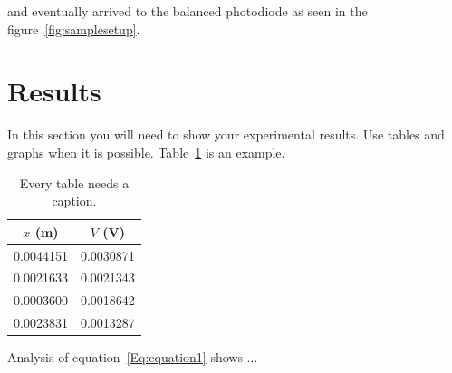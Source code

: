 \documentclass[letterpaper,12pt]{article}
\begin{document}

and eventually arrived to the
balanced photodiode as seen in the figure~\ref{fig:samplesetup}.


\section{Results}

In this section you will need to show your experimental results. Use tables and
graphs when it is possible. Table~\ref{tbl:bins} is an example.

\begin{table}[ht]
\begin{center}
\caption{Every table needs a caption.}
\label{tbl:bins} %
\begin{tabular}{|cc|} 
\hline
\multicolumn{1}{|c}{$x$ (m)} & \multicolumn{1}{c|}{$V$ (V)} \\
\hline
0.0044151 &   0.0030871 \\
0.0021633 &   0.0021343 \\
0.0003600 &   0.0018642 \\
0.0023831 &   0.0013287 \\
\hline
\end{tabular}
\end{center}
\end{table}

Analysis of equation~\ref{Eq:equation1} shows ...

\blindtext
\end{document}
